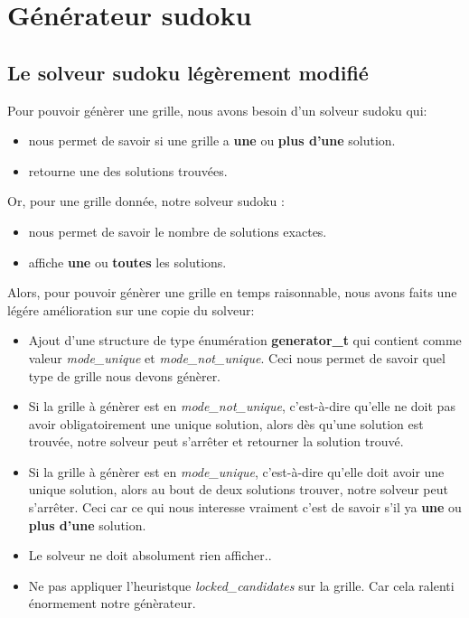 \documentclass{article}
\begin{document}
\section{Générateur sudoku}

\subsection{Le solveur sudoku légèrement modifié }

Pour pouvoir génèrer une grille, nous avons besoin d'un solveur sudoku qui:
\vspace{0.1cm}
\begin{itemize}
    \item nous permet de savoir si une grille a \textbf{une} ou \textbf{plus d'une} solution.\vspace{0.1cm}
    \item retourne une des solutions trouvées.
\end{itemize}
\vspace{0.2cm}
Or, pour une grille donnée, notre solveur sudoku :
\vspace{0.1cm}
\begin{itemize}
    \item nous permet de savoir le nombre de solutions exactes.\vspace{0.1cm}
    \item affiche \textbf{une} ou \textbf{toutes} les solutions.
\end{itemize}
\vspace{0.2cm}

Alors, pour pouvoir génèrer une grille en temps raisonnable, nous avons faits une légére amélioration sur une copie du solveur:
\vspace{0.2cm}
\begin{itemize}
    \item Ajout d'une structure de type énumération \textbf{generator\_t} qui contient comme valeur \textit{mode\_unique} et  \textit{mode\_not\_unique}. Ceci nous permet de savoir quel type de grille nous devons génèrer.\vspace{0.15cm}
    \item Si la grille à génèrer est en \textit{mode\_not\_unique}, c'est-à-dire qu'elle ne doit pas avoir obligatoirement une unique solution, alors dès qu'une solution est trouvée, notre solveur peut s'arrêter et retourner la solution trouvé.\vspace{0.15cm}
    \item Si la grille à génèrer est en \textit{mode\_unique}, c'est-à-dire qu'elle doit avoir une unique solution, alors au bout de deux solutions trouver, notre  solveur peut s'arrêter. Ceci car ce qui nous interesse vraiment c'est de savoir s'il ya \textbf{une} ou \textbf{plus d'une} solution.\vspace{0.15cm}
    \item Le solveur ne doit absolument rien afficher..\vspace{0.15cm}
    \item Ne pas appliquer l'heuristque \textit{locked\_candidates} sur la grille. Car cela ralenti énormement notre génèrateur.
\end{itemize}
\end{document}
